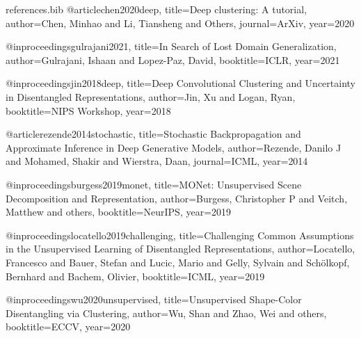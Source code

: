 \documentclass{article}
\begin{document}
\begin{filecontents}{references.bib}
@article{chen2020deep,
  title={Deep clustering: A tutorial},
  author={Chen, Minhao and Li, Tiansheng and Others},
  journal={ArXiv},
  year={2020}
}

@inproceedings{gulrajani2021,
  title={In Search of Lost Domain Generalization},
  author={Gulrajani, Ishaan and Lopez-Paz, David},
  booktitle={ICLR},
  year={2021}
}

@inproceedings{jin2018deep,
  title={Deep Convolutional Clustering and Uncertainty in Disentangled Representations},
  author={Jin, Xu and Logan, Ryan},
  booktitle={NIPS Workshop},
  year={2018}
}

@article{rezende2014stochastic,
  title={Stochastic Backpropagation and Approximate Inference in Deep Generative Models},
  author={Rezende, Danilo J and Mohamed, Shakir and Wierstra, Daan},
  journal={ICML},
  year={2014}
}

@inproceedings{burgess2019monet,
  title={MONet: Unsupervised Scene Decomposition and Representation},
  author={Burgess, Christopher P and Veitch, Matthew and others},
  booktitle={NeurIPS},
  year={2019}
}

@inproceedings{locatello2019challenging,
  title={Challenging Common Assumptions in the Unsupervised Learning of Disentangled Representations},
  author={Locatello, Francesco and Bauer, Stefan and Lucic, Mario and Gelly, Sylvain and Sch\"olkopf, Bernhard and Bachem, Olivier},
  booktitle={ICML},
  year={2019}
}

@inproceedings{wu2020unsupervised,
  title={Unsupervised Shape-Color Disentangling via Clustering},
  author={Wu, Shan and Zhao, Wei and others},
  booktitle={ECCV},
  year={2020}
}
\end{filecontents}
\end{document}
